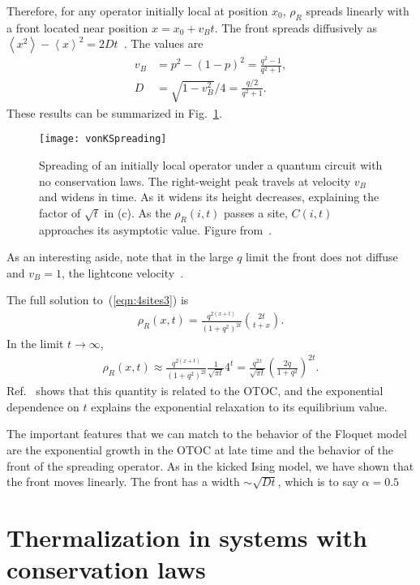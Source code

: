 \documentclass[a4paper,11pt]{article}
\renewcommand{\th}[1]{\frac{1}{#1}}
\newcommand{\ex}[1]{\left\langle #1 \right\rangle}
\newcommand{\nn}{\nonumber\\}
\begin{document}
Therefore, for any operator initially local at position $x_0$, $\rho_R$ spreads linearly with a front located near position $x = x_0 + v_B t$. The front spreads diffusively as $\ex{x^2}-\ex{x}^2=2Dt$~\cite{vonKeyserlingkHydro}. The values are
\begin{align}
v_B &= p^2-(1-p)^2 = \frac{q^2-1}{q^2+1},\nn
D   &= \sqrt{1-v_B^2}/4 = \frac{q/2}{q^2+1}.
\end{align}
These results can be summarized in Fig.~\ref{fig:vonKSpreading}.
\begin{figure}
	\centering
	\texttt{[image: vonKSpreading]}
	\caption{Spreading of an initially local operator under a quantum circuit with no conservation laws. The right-weight peak travels at velocity $v_B$ and widens in time. As it widens its height decreases, explaining the factor of $\sqrt{t}$ in (c). As the $\rho_R(i,t)$ passes a site, $C(i,t)$ approaches its asymptotic value. Figure from~\cite{vonKeyserlingkHydro}.}
	\label{fig:vonKSpreading}
\end{figure}
As an interesting aside, note that in the large $q$ limit the front does not diffuse and $v_B=1$, the lightcone velocity~\cite{NahumOpSp}.

The full solution to~(\ref{eqn:4sites3}) is~\cite{vonKeyserlingkHydro}
\begin{align}
\rho_R(x,t) = \frac{q^{2(x+t)}}{(1+q^2)^{2t}}{2t \choose t+x}.
\end{align}
In the limit $t\to\infty$,
\begin{align}
\rho_R(x,t) \approx \frac{q^{2(x+t)}}{(1+q^2)^{2t}} \th{\sqrt{\pi t}}4^t
= \frac{q^{2x}}{\sqrt{\pi t}} \left(\frac{2q}{1+q^2}\right)^{2t}.
\end{align}
Ref.~\cite{vonKeyserlingkHydro} shows that this quantity is related to the OTOC, and the exponential dependence on $t$ explains the exponential relaxation to its equilibrium value.

The important features that we can match to the behavior of the Floquet model are the exponential growth in the OTOC at late time and the behavior of the front of the spreading operator. As in the kicked Ising model, we have shown that the front moves linearly. The front has a width $\sim \sqrt{Dt}$, which is to say $\alpha=0.5$


\section{Thermalization in systems with conservation laws} \label{sec:cons}
\end{document}
